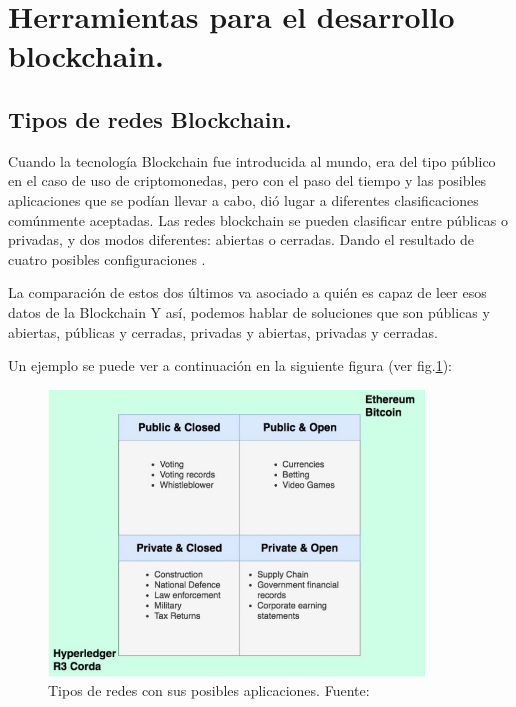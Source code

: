 \section{Herramientas para el desarrollo blockchain.}

\subsection{Tipos de redes Blockchain.}

Cuando la tecnología Blockchain fue introducida al mundo, era del tipo público en el caso de uso de criptomonedas, pero
con el paso del tiempo y las posibles aplicaciones que se podían llevar a cabo, dió lugar a diferentes clasificaciones 
comúnmente aceptadas. Las redes blockchain se pueden clasificar entre públicas o privadas, y dos modos diferentes: 
abiertas o cerradas. Dando el resultado de cuatro posibles configuraciones \cite{public-private-blockchain}.

\vspace{5mm}

\noindent La comparación de estos dos últimos va asociado a quién es capaz de leer esos datos de la Blockchain Y así, 
podemos hablar de soluciones que son públicas y abiertas, públicas y cerradas, privadas y abiertas, privadas y 
cerradas.

\vspace{5mm}

\noindent Un ejemplo se puede ver a continuación en la siguiente figura (ver fig.\ref{fig:tipos-de-redes}):

\vspace{5mm}

\begin{figure}[ht!]
    \centering
    \includegraphics[width=10cm]{imagenes/herramientas/tipos_de_redes}
    \caption{Tipos de redes con sus posibles aplicaciones. Fuente: \cite{public-private-blockchain}}
    \label{fig:tipos-de-redes}
\end{figure}

